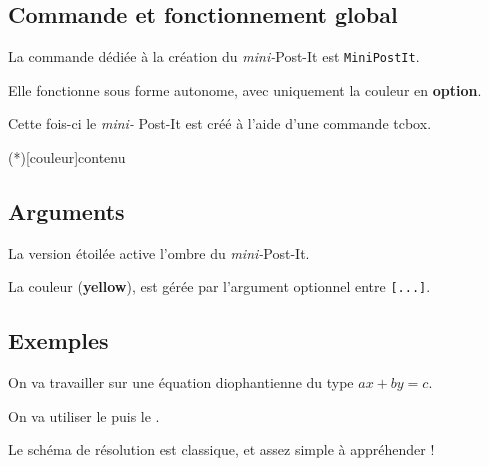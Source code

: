 \documentclass[french,a4paper,11pt]{article}
\newcommand\Cle[1]{{\bfseries\sffamily\textlangle #1\textrangle}}
\begin{document}
\subsection{Commande et fonctionnement global}

\begin{cautionblock}
La commande dédiée à la création du \textit{mini-}Post-It est \texttt{MiniPostIt}.

Elle fonctionne sous forme autonome, avec uniquement la couleur en \Cle{option}.

\smallskip

Cette fois-ci le \textit{mini-} Post-It est créé à l'aide d'une commande \textsf{tcbox}.
\end{cautionblock}

\begin{DemoCode}
\MiniPostIt(*)[couleur]{contenu}
\end{DemoCode}

\subsection{Arguments}

\begin{noteblock}
La version étoilée active l'ombre du \textit{mini-}Post-It.

La couleur (\Cle{yellow}), est gérée par l'argument optionnel entre \texttt{[...]}.
\end{noteblock}

\subsection{Exemples}

\begin{DemoCode}[]
On va travailler sur une équation diophantienne du type $ax+by=c$.

On va utiliser le  puis le .

Le schéma de résolution est classique, et assez simple à appréhender !
\end{DemoCode}
\end{document}
